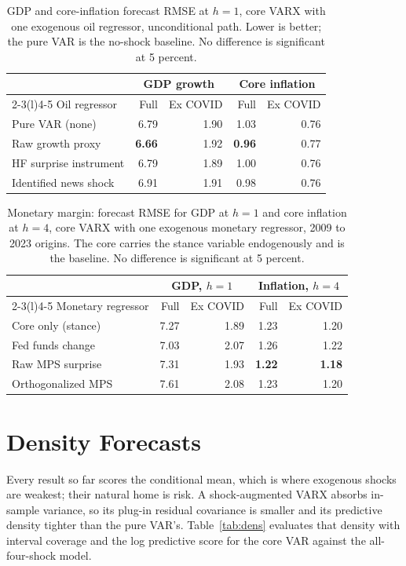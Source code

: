 \documentclass[conference]{IEEEtran}
\begin{document}
\begin{table}[t]
\caption{GDP and core-inflation forecast RMSE at $h=1$, core VARX with one exogenous oil regressor, unconditional path. Lower is better; the pure VAR is the no-shock baseline. No difference is significant at 5 percent.}
\label{tab:id}
\centering
\small
\setlength{\tabcolsep}{4pt}
\begin{tabular}{@{}lrrrr@{}}
\toprule
& \multicolumn{2}{c}{GDP growth} & \multicolumn{2}{c}{Core inflation} \\
\cmidrule(l){2-3}\cmidrule(l){4-5}
Oil regressor & Full & Ex COVID & Full & Ex COVID \\
\midrule
Pure VAR (none) & 6.79 & 1.90 & 1.03 & 0.76 \\
Raw growth proxy & \textbf{6.66} & 1.92 & \textbf{0.96} & 0.77 \\
HF surprise instrument & 6.79 & 1.89 & 1.00 & 0.76 \\
Identified news shock & 6.91 & 1.91 & 0.98 & 0.76 \\
\bottomrule
\end{tabular}
\end{table}

\begin{table}[t]
\caption{Monetary margin: forecast RMSE for GDP at $h=1$ and core inflation at $h=4$, core VARX with one exogenous monetary regressor, 2009 to 2023 origins. The core carries the stance variable endogenously and is the baseline. No difference is significant at 5 percent.}
\label{tab:mp}
\centering
\small
\setlength{\tabcolsep}{4pt}
\begin{tabular}{@{}lrrrr@{}}
\toprule
& \multicolumn{2}{c}{GDP, $h{=}1$} & \multicolumn{2}{c}{Inflation, $h{=}4$} \\
\cmidrule(l){2-3}\cmidrule(l){4-5}
Monetary regressor & Full & Ex COVID & Full & Ex COVID \\
\midrule
Core only (stance) & 7.27 & 1.89 & 1.23 & 1.20 \\
Fed funds change & 7.03 & 2.07 & 1.26 & 1.22 \\
Raw MPS surprise & 7.31 & 1.93 & \textbf{1.22} & \textbf{1.18} \\
Orthogonalized MPS & 7.61 & 2.08 & 1.23 & 1.20 \\
\bottomrule
\end{tabular}
\end{table}

\section{Density Forecasts}
Every result so far scores the conditional mean, which is where exogenous shocks are weakest; their natural home is risk. A shock-augmented VARX absorbs in-sample variance, so its plug-in residual covariance is smaller and its predictive density tighter than the pure VAR's. Table~\ref{tab:dens} evaluates that density with interval coverage and the log predictive score for the core VAR against the all-four-shock model.
\end{document}
